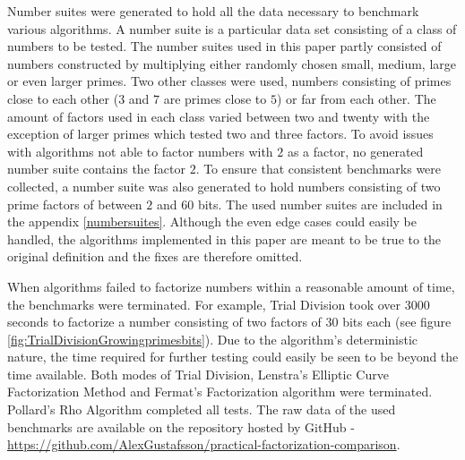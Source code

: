 Number suites were generated to hold all the data necessary to benchmark various algorithms. A number suite is a particular data set consisting of a class of numbers to be tested. The number suites used in this paper partly consisted of numbers constructed by multiplying either randomly chosen small, medium, large or even larger primes. Two other classes were used, numbers consisting of primes close to each other ($3$ and $7$ are primes close to $5$) or far from each other. The amount of factors used in each class varied between two and twenty with the exception of larger primes which tested two and three factors. To avoid issues with algorithms not able to factor numbers with $2$ as a factor, no generated number suite contains the factor $2$. To ensure that consistent benchmarks were collected, a number suite was also generated to hold numbers consisting of two prime factors of between $2$ and $60$ bits. The used number suites are included in the appendix \ref{numbersuites}. Although the even edge cases could easily be handled, the algorithms implemented in this paper are meant to be true to the original definition and the fixes are therefore omitted.

When algorithms failed to factorize numbers within a reasonable amount of time, the benchmarks were terminated. For example, Trial Division took over $3000$ seconds to factorize a number consisting of two factors of $30$ bits each (see figure \ref{fig:TrialDivisionGrowingprimesbits}). Due to the algorithm's deterministic nature, the time required for further testing could easily be seen to be beyond the time available. Both modes of Trial Division, Lenstra's Elliptic Curve Factorization Method and Fermat's Factorization algorithm were terminated. Pollard's Rho Algorithm completed all tests. The raw data of the used benchmarks are available on the repository hosted by GitHub - \href{https://github.com/AlexGustafsson/practical-factorization-comparison}{https://github.com/AlexGustafsson/practical-factorization-comparison}.